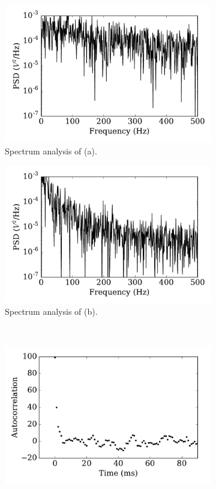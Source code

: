 \begin{figure}[tbp!]
\begin{subfigure}[t]{0.43\textwidth}
			\includegraphics[width=\textwidth]{pics_iconip/psd_tau1.pdf}
			\caption{Spectrum analysis of (a).}
		\end{subfigure}
		\begin{subfigure}[t]{0.43\textwidth}
			\includegraphics[width=\textwidth]{pics_iconip/psd_tau10.pdf}
			\caption{Spectrum analysis of (b).}
		\end{subfigure}\\
		\begin{subfigure}[t]{0.43\textwidth}
			\includegraphics[width=\textwidth]{pics_iconip/autocorr_tau1.pdf}

\end{subfigure}
\end{figure}

